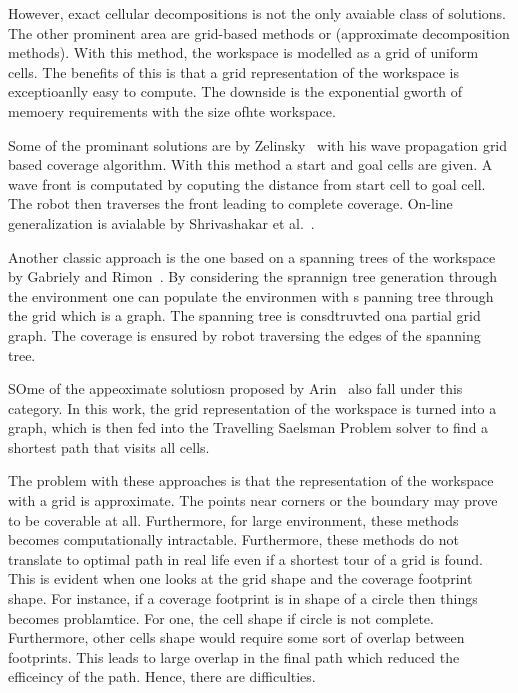 \documentclass[../main.tex]{subfiles}
\begin{document}
However, exact cellular decompositions is not the only avaiable class of solutions. The other prominent area are grid-based methods or (approximate decomposition methods). With this method, the workspace is modelled as a grid of uniform cells. The benefits of this is that a grid representation of the workspace is exceptioanlly easy to compute. The downside is the exponential gworth of memoery requirements with the size ofhte workspace.

Some of the prominant solutions are by Zelinsky~\cite{Zelinsky1993planning} with his wave propagation grid based coverage algorithm. With this method a start and goal cells are given. A wave front is computated by coputing the distance from start cell to goal cell. The robot then traverses the front leading to complete coverage. On-line generalization is avialable by Shrivashakar et al.~\cite{shivashankar2011real}.

Another classic approach is the one based on a spanning trees of the workspace by Gabriely and Rimon~\cite{Gabriely2001spanning}. By considering the sprannign tree generation through the environment one can populate the environmen with s panning tree through the grid which is a graph. The spanning tree is consdtruvted ona partial grid graph. The coverage is ensured by robot traversing the edges of the spanning tree. 

SOme of the appeoximate solutiosn proposed by Arin~\cite{arkin2000approximation} also fall under this category. In this work, the grid representation of the workspace is turned into a graph, which is then fed into the Travelling Saelsman Problem solver to find a shortest path that visits all cells. 

The problem with these approaches is that the representation of the workspace with a grid is approximate. The points near corners or the boundary may prove to be coverable at all. Furthermore, for large environment, these methods becomes computationally intractable. Furthermore, these methods do not translate to optimal path in real life even if a shortest tour of a grid is found. This is evident when one looks at the grid shape and the coverage footprint shape. For instance, if a coverage footprint is in shape of a circle then things becomes problamtice. For one, the cell shape if circle is not complete. Furthermore, other cells shape would require some sort of overlap between footprints. This leads to large overlap in the final path which reduced the efficeincy of the path. Hence, there are difficulties.
\end{document}
